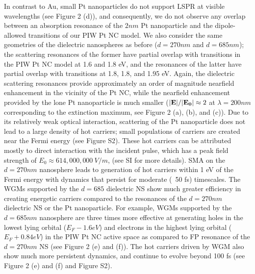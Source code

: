 \documentclass[journal=jpclcd,manuscript=article]{achemso}
\begin{document}
In contrast to Au, small Pt nanoparticles do not support LSPR at visible wavelengths (see Figure 2 (d)), and consequently, we do not
observe any overlap between an absorption resonance of the $2nm$ Pt nanoparticle and the dipole-allowed 
transitions of our PIW Pt NC model.  We also consider
the same geometries of the dielectric nanospheres as before ($d=270nm$ and $d=685 nm$); the scattering resonances of the former have partial overlap with transitions in the PIW Pt NC model at 1.6 and 1.8 eV, and the resonances of the latter have partial 
overlap with transitions at 1.8, 1.8, and 1.95 eV.  Again, the dielectric scattering resonances provide 
approximately an order of magnitude 
nearfield enhancement in the vicinity of the Pt NC, while the nearfield enhancement provided by the lone 
Pt nanoparticle is much smaller ($|{\bf E}|/|{\bf E_0}| \approx 2$ at $\lambda=200nm$ corresponding to the extinction maximum, see Figure 2 (a), (b), and (c)).
Due to its relatively weak optical interaction, scattering of the Pt nanoparticle does not lead to a large density of hot carriers; small populations
of carriers are created near the Fermi energy (see Figure S2).  These hot carriers can be attributed mostly to direct interaction with the 
incident pulse, which has a peak field strength of $E_0 \approx 614,000,000 \: V/m$, (see SI for more details).
SMA on the $d=270nm$ nanosphere
leads to generation of hot carriers within 1 eV of the Fermi energy with dynamics that persist for moderate (~50 fs) timescales.
The WGMs supported by the $d=685$ dielectric NS show much greater efficiency in creating energetic carriers compared
to the resonances of the $d=270nm$ dielectric NS or the Pt nanoparticle.  For example, WGMs supported by the $d=685nm$ nanosphere are three times
more effective at generating holes in the lowest lying orbital ($E_F - 1.6 eV$) 
and electrons in the highest 
lying orbital ($E_F + 0.84 eV$) in the PIW Pt NC active space as compared to FP resonance of the $d=270nm$ NS (see Figure 2 (e) and (f)).  
The hot carriers driven by WGM also show much more persistent dynamics, and continue to evolve beyond 100 fs (see Figure 2 (e) and (f) and Figure S2).
\end{document}
